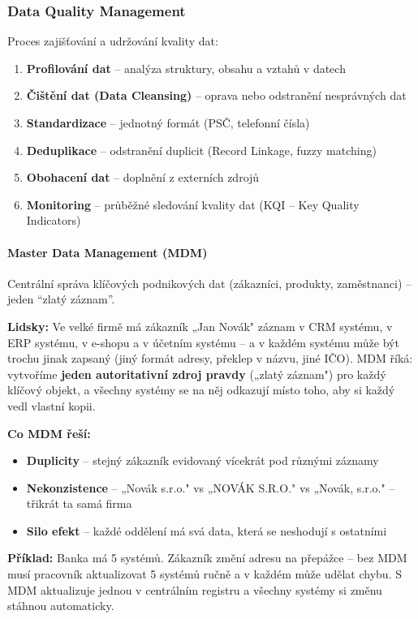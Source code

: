 \subsubsection{Data Quality Management}

Proces zajišťování a udržování kvality dat:
\begin{enumerate}
  \item \textbf{Profilování dat} -- analýza struktury, obsahu a vztahů v datech
  \item \textbf{Čištění dat (Data Cleansing)} -- oprava nebo odstranění nesprávných dat
  \item \textbf{Standardizace} -- jednotný formát (PSČ, telefonní čísla)
  \item \textbf{Deduplikace} -- odstranění duplicit (Record Linkage, fuzzy matching)
  \item \textbf{Obohacení dat} -- doplnění z externích zdrojů
  \item \textbf{Monitoring} -- průběžné sledování kvality dat (KQI -- Key Quality Indicators)
\end{enumerate}

\paragraph{Master Data Management (MDM)}
Centrální správa klíčových podnikových dat (zákazníci, produkty, zaměstnanci) -- jeden ``zlatý záznam''.

\textbf{Lidsky:} Ve velké firmě má zákazník „Jan Novák" záznam v CRM systému, v ERP systému,
v e-shopu a v účetním systému -- a v každém systému může být trochu jinak zapsaný (jiný formát
adresy, překlep v názvu, jiné IČO). MDM říká: vytvoříme \textbf{jeden autoritativní zdroj pravdy}
(„zlatý záznam") pro každý klíčový objekt, a všechny systémy se na něj odkazují místo toho,
aby si každý vedl vlastní kopii.

\textbf{Co MDM řeší:}
\begin{itemize}
  \item \textbf{Duplicity} -- stejný zákazník evidovaný vícekrát pod různými záznamy
  \item \textbf{Nekonzistence} -- „Novák s.r.o." vs „NOVÁK S.R.O." vs „Novák, s.r.o." -- třikrát ta samá firma
  \item \textbf{Silo efekt} -- každé oddělení má svá data, která se neshodují s ostatními
\end{itemize}

\textbf{Příklad:} Banka má 5 systémů. Zákazník změní adresu na přepážce -- bez MDM musí pracovník
aktualizovat 5 systémů ručně a v každém může udělat chybu. S MDM aktualizuje jednou v centrálním
registru a všechny systémy si změnu stáhnou automaticky.

